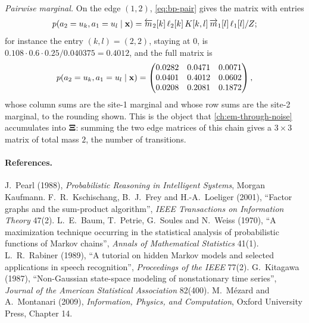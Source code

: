 \emph{Pairwise marginal.} On the edge $(1,2)$, \cref{eq:bp-pair} gives the matrix with
entries
\[
  p(a_2=u_{k},a_1=u_{l}\mid\mathbf{x})=\overleftarrow{m}_2[k]\,\ell_2[k]\,K[k,l]\,\overrightarrow{m}_1[l]\,\ell_1[l]/Z;
\]
for instance the entry $(k,l)=(2,2)$, staying at $0$, is
$0.108\cdot0.6\cdot0.25/0.040375=0.4012$, and the full matrix is
\[
  p(a_2=u_{k},a_1=u_{l}\mid\mathbf{x})=
  \begin{pmatrix}0.0282&0.0471&0.0071\\0.0401&0.4012&0.0602\\0.0208&0.2081&0.1872\end{pmatrix},
\]
whose column sums are the site-1 marginal and whose row sums are the site-2 marginal,
to the rounding shown. This is the object that \cref{ch:em-through-noise} accumulates
into $\mathbf{\Xi}$: summing the two edge matrices of this chain gives a $3\times3$ matrix of
total mass $2$, the number of transitions.


\paragraph{References.}
J.~Pearl (1988), \emph{Probabilistic Reasoning in Intelligent Systems}, Morgan Kaufmann.
F.~R.~Kschischang, B.~J.~Frey and H.-A.~Loeliger (2001), ``Factor graphs and the sum-product
algorithm'', \emph{IEEE Transactions on Information Theory} 47(2).
L.~E.~Baum, T.~Petrie, G.~Soules and N.~Weiss (1970), ``A maximization technique occurring
in the statistical analysis of probabilistic functions of Markov chains'', \emph{Annals of
Mathematical Statistics} 41(1).
L.~R.~Rabiner (1989), ``A tutorial on hidden Markov models and selected applications in
speech recognition'', \emph{Proceedings of the IEEE} 77(2).
G.~Kitagawa (1987), ``Non-Gaussian state-space modeling of nonstationary time series'',
\emph{Journal of the American Statistical Association} 82(400).
M.~M\'ezard and A.~Montanari (2009), \emph{Information, Physics, and Computation}, Oxford
University Press, Chapter 14.
